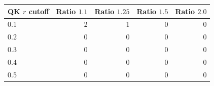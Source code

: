 \begin{tabular}{lrrrr}
\toprule
QK $r$ cutoff & Ratio $1.1$ & Ratio $1.25$ & Ratio $1.5$ & Ratio $2.0$ \\
\midrule
0.1 & 2 & 1 & 0 & 0 \\
0.2 & 0 & 0 & 0 & 0 \\
0.3 & 0 & 0 & 0 & 0 \\
0.4 & 0 & 0 & 0 & 0 \\
0.5 & 0 & 0 & 0 & 0 \\
\bottomrule
\end{tabular}
